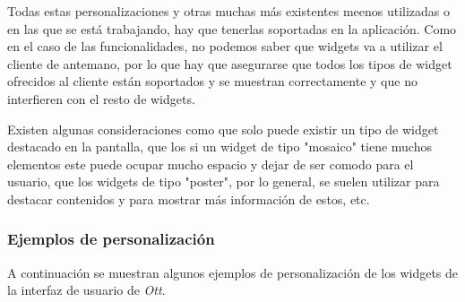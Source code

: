 Todas estas personalizaciones y otras muchas más existentes meenos utilizadas o en las que se está trabajando, hay que tenerlas soportadas en la aplicación. 
Como en el caso de las funcionalidades, no podemos saber que widgets va a utilizar el cliente de antemano, por lo que hay que asegurarse que todos los tipos 
de widget ofrecidos al cliente están soportados y se muestran correctamente y que no interfieren con el resto de widgets. 

Existen algunas consideraciones como que solo puede existir un tipo de widget destacado en la pantalla, que los si un widget de tipo "mosaico" tiene muchos
elementos este puede ocupar mucho espacio y dejar de ser comodo para el usuario, que los widgets de tipo "poster", por lo general, se suelen utilizar para
destacar contenidos y para mostrar más información de estos, etc.

\subsubsection{Ejemplos de personalización}
\label{sec:diseno-ux-ejemplos}

A continuación se muestran algunos ejemplos de personalización de los widgets de la interfaz de usuario de \textit{Ott}.

